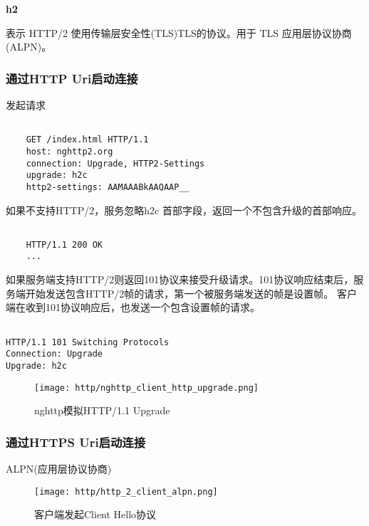 \textbf{h2}

表示 HTTP/2 使用传输层安全性(TLS)TLS的协议。用于 TLS 应用层协议协商(ALPN)。


\subsubsection{通过HTTP Uri启动连接}

发起请求


\begin{lstlisting}[style=cshell]

    GET /index.html HTTP/1.1
    host: nghttp2.org
    connection: Upgrade, HTTP2-Settings
    upgrade: h2c
    http2-settings: AAMAAABkAAQAAP__

\end{lstlisting}


如果不支持HTTP/2，服务忽略h2c 首部字段，返回一个不包含升级的首部响应。

\begin{lstlisting}[style=cshell]

    HTTP/1.1 200 OK
    ...

\end{lstlisting}


如果服务端支持HTTP/2则返回101协议来接受升级请求。101协议响应结束后，服务端开始发送包含HTTP/2帧的请求，第一个被服务端发送的帧是设置帧。
客户端在收到101协议响应后，也发送一个包含设置帧的请求。

\begin{lstlisting}[style=cshell]

HTTP/1.1 101 Switching Protocols
Connection: Upgrade
Upgrade: h2c

\end{lstlisting}


\begin{figure}[H]
    \centering
    \texttt{[image: http/nghttp\_client\_http\_upgrade.png]}
    \caption{nghttp模拟HTTP/1.1 Upgrade}
\end{figure}


\subsubsection{通过HTTPS Uri启动连接}

ALPN(应用层协议协商)

\begin{figure}[H]
    \centering
    \texttt{[image: http/http\_2\_client\_alpn.png]}
    \caption{客户端发起Client Hello协议}
\end{figure}


